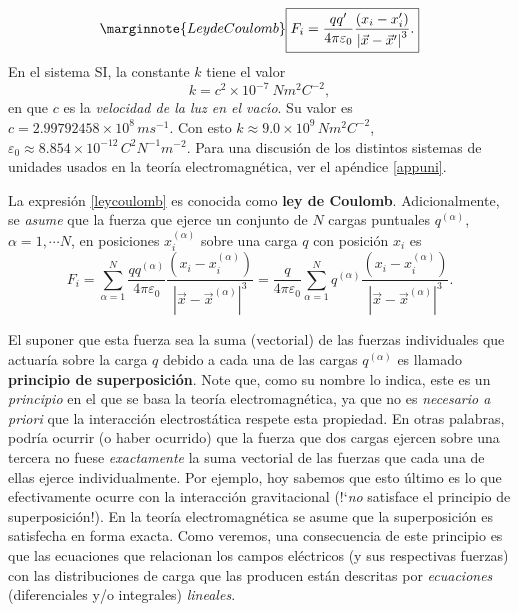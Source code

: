 \begin{equation}\marginnote{Ley de Coulomb}
\boxed{F_i=\frac{qq'}{4\pi\varepsilon_0}\frac{\left(  x_i-x_i^{\prime
}\right)  }{\left\vert \vec x-\vec x'\right\vert ^3}.}\label{leycoulomb}%
\end{equation}
En el sistema SI, la constante
$k$ tiene el valor
\begin{equation}
k=c^2\times 10^{-7}\ Nm^2C^{-2},
\end{equation}
en que $c$ es la \textit{velocidad de la luz en el vac\'{\i}o}. Su valor es $c=2.99792458\times 10^{8}\,ms^{-1}$. Con esto $k\approx 9.0\times
10^{9}\,Nm^2C^{-2}$, $\varepsilon _0\approx 8.854\times 10^{-12}
\,C^2N^{-1}m^{-2}$. Para una discusión de los distintos sistemas de unidades usados en la teoría electromagnética, ver el apéndice \ref{appuni}.

La expresión \eqref{leycoulomb} es conocida como \textbf{ley de Coulomb}. Adicionalmente, se \textit{asume} que la fuerza que ejerce un conjunto de $N$ cargas puntuales $q^{(\alpha)}$, $\alpha=1,\cdots N$, en posiciones $x^{(\alpha)}_i$ sobre una carga $q$ con posición $x_i$ es
\begin{equation}
F_i   =\sum_{\alpha=1}^{N}\frac{qq^{(\alpha)}}{4\pi\varepsilon_0}\frac{\left(
x_i-x^{(\alpha)}_i\right)  }{\left\vert  \vec x-\vec x^{(\alpha)}\right\vert^3}
=\frac{q}{4\pi\varepsilon_0}\sum_{\alpha=1}^{N}q^{(\alpha)}\frac{\left(
x_i-x^{(\alpha)}_i\right) }{\left\vert  \vec x-\vec
x^{(\alpha)}\right\vert^3}.\label{leycoulomb-discre}
\end{equation}

El suponer que esta fuerza sea la suma (vectorial) de las fuerzas individuales que actuaría sobre la carga $q$ debido a cada una de las cargas $q^{(\alpha)}$ es llamado \textbf{principio de superposición}. Note que, como su nombre lo indica, este es un \textit{principio} en el que se basa la teoría electromagnética, ya que no es \textit{necesario a priori} que la interacción electrostática respete esta propiedad. En otras palabras, podría ocurrir (o haber ocurrido) que la fuerza que dos cargas ejercen sobre una tercera no fuese \textit{exactamente} la suma vectorial de las fuerzas que cada una de ellas ejerce individualmente. Por ejemplo, hoy sabemos que esto último es lo que efectivamente ocurre con la interacción gravitacional (!`\textit{no} satisface el principio de superposición!). En la teoría electromagnética se asume que la superposición es satisfecha en forma exacta. Como veremos, una consecuencia de este principio es que las ecuaciones que relacionan los campos eléctricos (y sus respectivas fuerzas) con las distribuciones de carga que las producen están descritas por \textit{ecuaciones} (diferenciales y/o integrales) \textit{lineales}.


